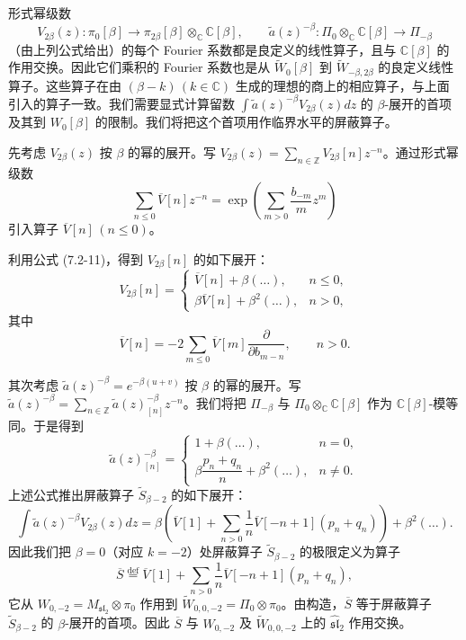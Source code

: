 形式幂级数
\[
    V_{2\beta}(z):\pi_0[\beta]\to\pi_{2\beta}[\beta]\otimes_{\mathbb{C}}\mathbb{C}[\beta],\qquad
    \widetilde{a}(z)^{-\beta}:\Pi_0\otimes_{\mathbb{C}}\mathbb{C}[\beta]\to\Pi_{-\beta}
\]
（由上列公式给出）的每个 Fourier 系数都是良定义的线性算子，且与 $\mathbb{C}[\beta]$ 的作用交换。因此它们乘积的 Fourier 系数也是从 $\widetilde{W}_0[\beta]$ 到 $\widetilde{W}_{-\beta,2\beta}$ 的良定义线性算子。这些算子在由 $(\beta-k)\,(k\in\mathbb{C})$ 生成的理想的商上的相应算子，与上面引入的算子一致。我们需要显式计算留数 $\int\widetilde{a}(z)^{-\beta}V_{2\beta}(z)dz$ 的 $\beta$-展开的首项及其到 $W_0[\beta]$ 的限制。我们将把这个首项用作临界水平的屏蔽算子。

先考虑 $V_{2\beta}(z)$ 按 $\beta$ 的幂的展开。写 $V_{2\beta}(z)=\sum_{n\in\mathbb{Z}}V_{2\beta}[n]z^{-n}$。通过形式幂级数
\begin{equation}
    \sum_{n\le0}\overline{V}[n]z^{-n}=\exp\left(\sum_{m>0}\frac{b_{-m}}{m}z^m\right)
    \tag{7.3-6}
\end{equation}
引入算子 $\overline{V}[n]\,(n\le0)$。

利用公式 (7.2-11)，得到 $V_{2\beta}[n]$ 的如下展开：
\[
    V_{2\beta}[n]=
    \begin{cases}
        \overline{V}[n]+\beta(\dots), & n\le0,\\
        \beta\overline{V}[n]+\beta^2(\dots), & n>0,
    \end{cases}
\]
其中
\begin{equation}
    \overline{V}[n]=-2\sum_{m\le0}\overline{V}[m]\frac{\partial}{\partial b_{m-n}},\qquad n>0.
    \tag{7.3-7}
\end{equation}

其次考虑 $\widetilde{a}(z)^{-\beta}=e^{-\beta(u+v)}$ 按 $\beta$ 的幂的展开。写 $\widetilde{a}(z)^{-\beta}=\sum_{n\in\mathbb{Z}}\widetilde{a}(z)^{-\beta}_{[n]}z^{-n}$。我们将把 $\Pi_{-\beta}$ 与 $\Pi_0\otimes_{\mathbb{C}}\mathbb{C}[\beta]$ 作为 $\mathbb{C}[\beta]$-模等同。于是得到
\[
    \widetilde{a}(z)^{-\beta}_{[n]}=
    \begin{cases}
        1+\beta(\dots), & n=0,\\
        \beta\dfrac{p_n+q_n}{n}+\beta^2(\dots), & n\ne0.
    \end{cases}
\]
上述公式推出屏蔽算子 $\widetilde{S}_{\beta-2}$ 的如下展开：
\[
    \int\widetilde{a}(z)^{-\beta}V_{2\beta}(z)dz=\beta\left(\overline{V}[1]+\sum_{n>0}\frac{1}{n}\overline{V}[-n+1](p_n+q_n)\right)+\beta^2(\dots).
\]
因此我们把 $\beta=0$（对应 $k=-2$）处屏蔽算子 $\widetilde{S}_{\beta-2}$ 的极限定义为算子
\begin{equation}
    \overline{S}\overset{\mathrm{def}}{=}\overline{V}[1]+\sum_{n>0}\frac{1}{n}\overline{V}[-n+1](p_n+q_n),
    \tag{7.3-8}
\end{equation}
它从 $W_{0,-2}=M_{\mathfrak{sl}_2}\otimes\pi_0$ 作用到 $\widetilde{W}_{0,0,-2}=\Pi_0\otimes\pi_0$。由构造，$\overline{S}$ 等于屏蔽算子 $\widetilde{S}_{\beta-2}$ 的 $\beta$-展开的首项。因此 $\overline{S}$ 与 $W_{0,-2}$ 及 $\widetilde{W}_{0,0,-2}$ 上的 $\widehat{\mathfrak{sl}}_2$ 作用交换。

